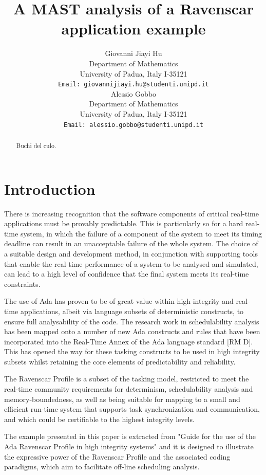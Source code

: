 \documentclass{article}
\title{A MAST analysis of a Ravenscar application example}
\author{
  Giovanni Jiayi Hu\\
  Department of Mathematics\\
  University of Padua, Italy I-35121\\
  \texttt{Email: giovannijiayi.hu@studenti.unipd.it} \\
   \And
   Alessio Gobbo \\
   Department of Mathematics\\
   University of Padua, Italy I-35121\\
   \texttt{Email: alessio.gobbo@studenti.unipd.it} \\
}
\begin{document}
\maketitle

\begin{abstract}
Buchi del culo. \lipsum[1]
\end{abstract}



\section{Introduction}

There is increasing recognition that the software components of critical real-time applications must be provably predictable. This is particularly so for a hard real-time system, in which the failure of a component of the system to meet its timing deadline can result in an unacceptable failure of the whole system. The choice of a suitable design and development method, in conjunction with supporting tools that enable the real-time performance of a system to be analysed and simulated, can lead to a high level of confidence that the final system meets its real-time constraints.

The use of Ada has proven to be of great value within high integrity and real-time applications, albeit via language subsets of deterministic constructs, to ensure full analysability of the code. The research work in schedulability analysis has been mapped onto a number of new Ada constructs and rules that have been incorporated into the Real-Time Annex of the Ada language standard [RM D]. This has opened the way for these tasking constructs to be used in high integrity subsets whilst retaining the core elements of predictability and reliability.

The Ravenscar Profile is a subset of the tasking model, restricted to meet the real-time community requirements for determinism, schedulability analysis and memory-boundedness, as well as being suitable for mapping to a small and efficient run-time system that supports task synchronization and communication, and which could be certifiable to the highest integrity levels.

The example presented in this paper is extracted from "Guide for the use of the
Ada Ravenscar Profile in
high integrity systems" \cite{ycs} and it is designed to illustrate the expressive power of the Ravenscar Profile and the associated coding paradigms, which aim to facilitate off-line scheduling analysis.
\end{document}
